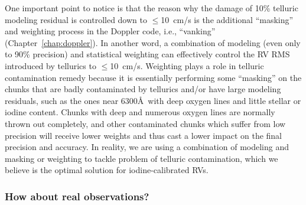 One important point to notice is that the reason why the damage of
10\% telluric modeling residual is controlled down to $\leq$10~cm/s is
the additional ``masking'' and weighting process in the Doppler code,
i.e., ``vanking'' (Chapter~\ref{chap:doppler}). In another word, a
combination of modeling (even only to 90\% precision) and statistical
weighting can effectively control the RV RMS introduced by tellurics
to $\leq$10~cm/s. Weighting plays a role in telluric contamination
remedy because it is essentially performing some ``masking'' on the
chunks that are badly contaminated by tellurics and/or have large
modeling residuals, such as the ones near 6300\AA\ with deep oxygen
lines and little stellar or iodine content.  Chunks with deep and
numerous oxygen lines are normally thrown out completely, and other
contaminated chunks which suffer from low precision will receive lower
weights and thus cast a lower impact on the final precision and
accuracy. In reality, we are using a combination of modeling and
masking or weighting to tackle problem of telluric contamination,
which we believe is the optimal solution for iodine-calibrated RVs.

\subsubsection{How about real observations?}

